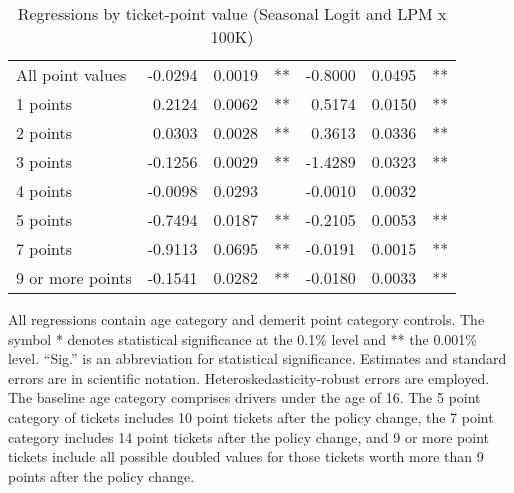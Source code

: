 \begin{table}
\begin{tabular}{l r r l r r l}
All point values                &  -0.0294        &  0.0019       &   **       &  -0.8000        &  0.0495       &   **       \\ 
1 points                        &  0.2124        &  0.0062       &   **       &  0.5174        &  0.0150       &   **       \\ 
2 points                        &  0.0303        &  0.0028       &   **       &  0.3613        &  0.0336       &   **       \\ 
3 points                        &  -0.1256        &  0.0029       &   **       &  -1.4289        &  0.0323       &   **       \\ 
4 points                        &  -0.0098        &  0.0293       &            &  -0.0010        &  0.0032       &            \\ 
5 points                        &  -0.7494        &  0.0187       &   **       &  -0.2105        &  0.0053       &   **       \\ 
7 points                        &  -0.9113        &  0.0695       &   **       &  -0.0191        &  0.0015       &   **       \\ 
9 or more points                &  -0.1541        &  0.0282       &   **       &  -0.0180        &  0.0033       &   **       \\ 

\hline 

\end{tabular} 
\caption{Regressions by ticket-point value (Seasonal Logit and LPM x 100K)} 
All regressions contain age category and demerit point category controls. 
The symbol * denotes statistical significance at the 0.1\% level 
and ** the 0.001\% level. 
``Sig.'' is an abbreviation for statistical significance. 
Estimates and standard errors are in scientific notation. 
Heteroskedasticity-robust errors are employed. 
The baseline age category comprises drivers under the age of 16. 
The 5 point category of tickets includes 10 point tickets after the policy change,  
the 7 point category includes 14 point tickets after the policy change,  
and 9 or more point tickets include all possible doubled values for those tickets  
worth more than 9 points after the policy change. 
\label{tab:seas_Logit_vs_LPMx100K_regs_by_points} 
\end{table} 
 
